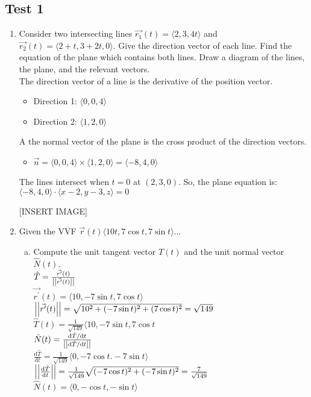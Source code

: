 \subsection{Test 1}
\begin{enumerate}
	\item Consider two intersecting lines $\vec{r_1}(t)=\langle 2,3,4t\rangle$ and $\vec{r_2}(t)=\langle 2+t,3+2t,0\rangle$. Give the direction vector of each line. Find the equation of the plane which contains both lines. Draw a diagram of the lines, the plane, and the relevant vectors.\\
	\indent
	The direction vector of a line is the derivative of the position vector.
	\begin{itemize}
		\item Direction 1: $\langle 0,0,4\rangle$
		\item Direction 2: $\langle 1,2,0\rangle$
	\end{itemize}
	A the normal vector of the plane is the cross product of the direction vectors.
	\begin{itemize}
		\item $\vec{n}=\langle 0,0,4\rangle\times\langle 1,2,0\rangle=\langle -8,4,0\rangle$
	\end{itemize}
	The lines intersect when $t=0$ at $(2,3,0)$.
	So, the plane equation is: $\langle -8,4,0\rangle\cdot\langle x-2,y-3,z\rangle=0$
	
	[INSERT IMAGE]
	
	
	\item Given the VVF $\vec{r}(t)\langle 10t, 7\cos{t}, 7\sin{t}\rangle$...\\
	\begin{enumerate}[a.]
		\item Compute the unit tangent vector $\hat{T}(t)$ and the unit normal vector $\hat{N}(t)$.\\
		\indent
		$\hat{T}=\frac{\vec{r^\prime}(t)}{\left|\left|\vec{r^\prime}(t)\right|\right|}$\\
		$\vec{r^\prime}(t)=\langle 10,-7\sin{t},7\cos{t}\rangle$\\
		$\left|\left|\vec{r^\prime}(t)\right|\right|=\sqrt{10^2+(-7\sin{t})^2+(7\cos{t})^2}=\sqrt{149}$\\
		$\hat{T}(t)=\frac{1}{\sqrt{149}}\langle 10,-7\sin{t},7\cos{t}$\\
		$\hat{N}(t)=\frac{\mathrm{d}\hat{T}/\mathrm{d}t}{\left|\left|\mathrm{d}\hat{T}/\mathrm{d}t\right|\right|}$\\
		$\frac{\mathrm{d}\hat{T}}{\mathrm{d}t}=\frac{1}{\sqrt{149}}\langle 0,-7\cos{t}.-7\sin{t}\rangle$\\
		$\left|\left|\frac{\mathrm{d}\hat{T}}{\mathrm{d}t}\right|\right|=\frac{1}{\sqrt{149}}\sqrt{(-7\cos{t})^2+(-7\sin{t})^2}=\frac{7}{\sqrt{149}}$\\
		$\hat{N}(t)=\langle 0,-\cos{t},-\sin{t}\rangle$
		

\end{enumerate}
\end{enumerate}
